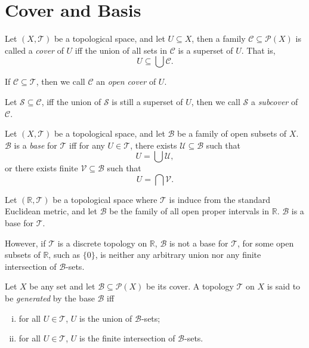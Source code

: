 \section{Cover and Basis}


\begin{definition}
	[cover]
	\label{def: cover}
	Let $(X, \mathcal T)$ be a topological space, and let $U \subseteq X$, then a family $\mathcal C \subseteq \mathcal P(X)$ is called a \textit{cover} of $U$ iff the union of all sets in $\mathcal C$ is a superset of $U$. That is,
	$$
	U \subseteq \bigcup \mathcal C.
	$$
	
	If $\mathcal C \subseteq \mathcal T$, then we call $\mathcal C$ an \textit{open cover} of $U$.
	
	Let $\mathcal S \subseteq \mathcal C$, iff the union of $\mathcal S$ is still a superset of $U$, then we call $\mathcal S$ a \textit{subcover} of $\mathcal C$.
\end{definition}


\begin{definition}
	[basis]
	\label{def: basis}
	Let $(X, \mathcal T)$ be a topological space, and let $\mathcal B$ be a family of open subsets of $X$. $\mathcal B$ is a \textit{base} for $\mathcal T$ iff for any $U \in \mathcal T$, there exists $\mathcal U \subseteq \mathcal B$ such that
	$$
	U = \bigcup \mathcal U,
	$$
	or there exists finite $\mathcal V \subseteq \mathcal B$ such that
	$$
	U = \bigcap \mathcal V.
	$$
\end{definition}


\begin{example}
	Let $(\mathbb R, \mathcal T)$ be a topological space where $\mathcal T$ is induce from the standard Euclidean metric, and let $\mathcal B$ be the family of all open proper intervals in $\mathbb R$. $\mathcal B$ is a base for $\mathcal T$.
	
	However, if $\mathcal T$ is a discrete topology on $\mathbb R$, $\mathcal B$ is not a base for $\mathcal T$, for some open subsets of $\mathbb R$, such as $\{0\}$, is neither any arbitrary union nor any finite intersection of $\mathcal B$-sets.
\end{example}


\begin{definition}
	\label{def: generated by basis}
	Let $X$ be any set and let $\mathcal B \subseteq \mathcal P(X)$ be its cover. A topology $\mathcal T$ on $X$ is said to be \textit{generated} by the base $\mathcal B$ iff
	\begin{enumerate}[(i)]
		\item for all $U \in \mathcal T$, $U$ is the union of $\mathcal B$-sets;
		\item for all $U \in \mathcal T$, $U$ is the finite intersection of $\mathcal B$-sets.
	\end{enumerate}
\end{definition}


